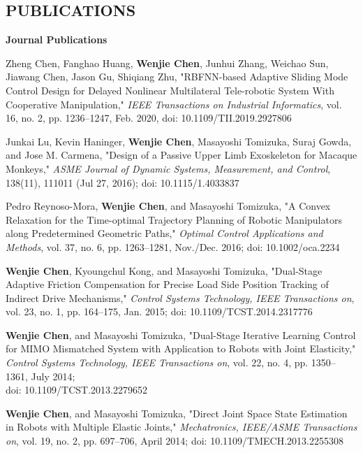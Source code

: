 \documentclass[UTF8,fontset=none]{res}
\begin{document}
\begin{resume}
\section{PUBLICATIONS}
\vspace{0.1in}
    \textbf{Journal Publications} %
    \begin{etaremune}[start=8]
    \item Zheng Chen, Fanghao Huang, \textbf{Wenjie Chen}, Junhui Zhang, Weichao Sun, Jiawang Chen, Jason Gu, Shiqiang Zhu, "RBFNN-based Adaptive Sliding Mode Control Design for Delayed Nonlinear Multilateral Tele-robotic System With Cooperative Manipulation," \emph{IEEE Transactions on Industrial Informatics}, vol. 16, no. 2, pp. 1236--1247, Feb. 2020, doi: 10.1109/TII.2019.2927806
    \item Junkai Lu, Kevin Haninger, \textbf{Wenjie Chen}, Masayoshi Tomizuka, Suraj Gowda, and Jose M. Carmena, "Design of a Passive Upper Limb Exoskeleton for Macaque Monkeys," \emph{ASME Journal of Dynamic Systems, Measurement, and Control}, 138(11), 111011 (Jul 27, 2016); doi: 10.1115/1.4033837
    \item Pedro Reynoso-Mora, \textbf{Wenjie Chen}, and Masayoshi Tomizuka, "A Convex Relaxation for the Time-optimal Trajectory Planning of Robotic Manipulators along Predetermined Geometric Paths," \emph{Optimal Control Applications and Methods}, vol. 37, no. 6, pp. 1263--1281, Nov./Dec. 2016; doi: 10.1002/oca.2234
    \item \textbf{Wenjie Chen}, Kyoungchul Kong, and Masayoshi Tomizuka, "Dual-Stage Adaptive Friction Compensation for Precise Load Side Position Tracking of Indirect Drive Mechanisms," \emph{Control Systems Technology, IEEE Transactions on}, vol. 23, no. 1, pp. 164--175, Jan. 2015;  doi: 10.1109/TCST.2014.2317776
    \item \textbf{Wenjie Chen}, and Masayoshi Tomizuka, "Dual-Stage Iterative Learning Control for MIMO Mismatched System with Application to Robots with Joint Elasticity," \emph{Control Systems Technology, IEEE Transactions on}, vol. 22, no. 4, pp. 1350--1361, July 2014; \\doi: 10.1109/TCST.2013.2279652
    \item \textbf{Wenjie Chen}, and Masayoshi Tomizuka, "Direct Joint Space State Estimation in Robots with Multiple Elastic Joints," \emph{Mechatronics, IEEE/ASME Transactions on}, vol. 19, no. 2, pp. 697--706, April 2014; doi: 10.1109/TMECH.2013.2255308

\end{etaremune}
\end{resume}
\end{document}
